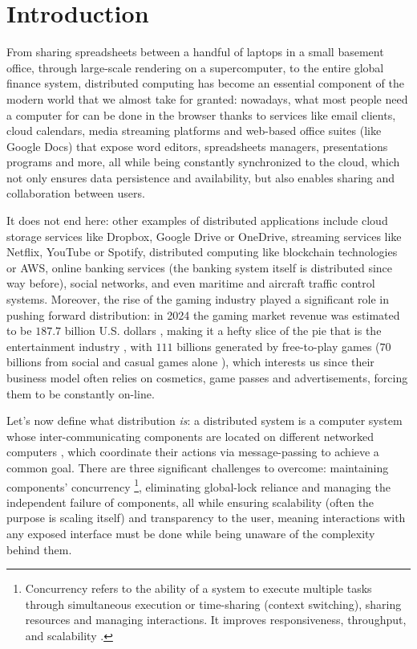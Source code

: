 \section{Introduction}

From sharing spreadsheets between a handful of laptops in a small basement office, through large-scale rendering on a supercomputer, to the entire global finance system, distributed computing has become an essential component of the modern world that we almost take for granted: nowadays, what most people need a computer for can be done in the browser thanks to services like email clients, cloud calendars, media streaming platforms and web-based office suites (like Google Docs) that expose word editors, spreadsheets managers, presentations programs and more, all while being constantly synchronized to the cloud, which not only ensures data persistence and availability, but also enables sharing and collaboration between users. 

It does not end here: other examples of distributed applications include cloud storage services like Dropbox, Google Drive or OneDrive, streaming services like Netflix, YouTube or Spotify, distributed computing like blockchain technologies or AWS, online banking services (the banking system itself is distributed since way before), social networks, and even maritime and aircraft traffic control systems.
Moreover, the rise of the gaming industry played a significant role in pushing forward distribution: in 2024 the gaming market revenue was estimated to be $187.7$ billion U.S. dollars \cite{newzoo}, making it a hefty slice of the pie that is the entertainment industry \cite{pwc}, with $111$ billions generated by free-to-play games \cite{f2prevenue} ($70$ billions from social and casual games alone \cite{casualgames}), which interests us since their business model often relies on cosmetics, game passes and advertisements, forcing them to be constantly on-line. 

Let's now define what distribution \textit{is}: a distributed system is a computer system whose inter-communicating components are located on different networked computers \cite{tanenbaum2017distributed,Apt2009}, which coordinate their actions via message-passing to achieve a common goal. There are three significant challenges to overcome: maintaining components' concurrency \footnote{Concurrency refers to the ability of a system to execute multiple tasks through simultaneous execution or time-sharing (context switching), sharing resources and managing interactions. It improves responsiveness, throughput, and scalability \cite{OSconcepts, computerOrganization, george_coulouris_distributed_2012, parallelComputing, parallelDistributedHandbook}.}, eliminating global-lock reliance and managing the independent failure of components, all while ensuring scalability (often the purpose is scaling itself) and transparency to the user, meaning interactions with any exposed interface must be done while being unaware of the complexity behind them.

